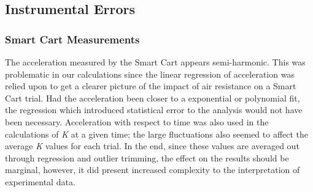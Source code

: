 \documentclass[
    letterpaper,
    man,
    floatsintext,
    british
]{apa6}
\begin{document}
\subsection{Instrumental Errors}
\subsubsection{Smart Cart Measurements}
The acceleration measured by the Smart Cart appears semi-harmonic. This was problematic in our calculations since
the linear regression of acceleration was relied upon to get a clearer picture of the impact of air resistance on
a Smart Cart trial. Had the acceleration been closer to a exponential or polynomial fit, the regression which introduced    
statistical error to the analysis would not have been necessary. Acceleration with respect to time was also used in the calculations of \textit{K} at a given time;
the large fluctuations also seemed to affect the average \textit{K} values for each trial. In the end, since these values
are averaged out through regression and outlier trimming, the effect on the results should be marginal, however, it did
present increased complexity to the interpretation of experimental data.



\end{document}
